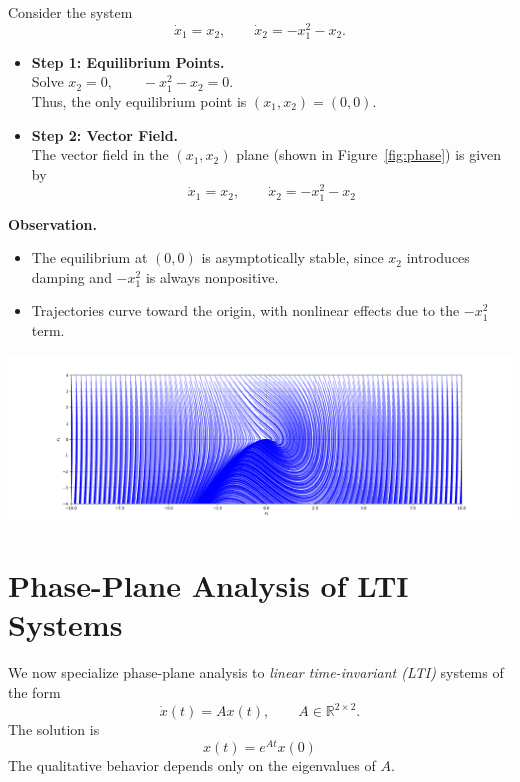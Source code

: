 \begin{example}
Consider the system
\begin{equation}
    \dot{x}_1 = x_2, \qquad 
    \dot{x}_2 = -x_1^2 - x_2.
\end{equation}

\begin{itemize}
\item \textbf{Step 1: Equilibrium Points.}  
\\Solve
$
x_2 = 0, \qquad -x_1^2 - x_2 = 0.
$
\\Thus, the only equilibrium point is
$
\boxed{(x_1, x_2) = (0,0)}.
$
\medskip
\item \textbf{Step 2: Vector Field.}  
\\The vector field in the $(x_1,x_2)$ plane (shown in Figure~\ref{fig:phase}) is given by
\begin{equation}
\boxed{\dot{x}_1 = x_2, \qquad 
\dot{x}_2 = -x_1^2 - x_2}
\end{equation}
\end{itemize}

\textbf{Observation.}  
\begin{itemize}
    \item The equilibrium at $(0,0)$ is asymptotically stable, since $x_2$ introduces damping and $-x_1^2$ is always nonpositive.  
    \item Trajectories curve toward the origin, with nonlinear effects due to the $-x_1^2$ term.
\end{itemize}
\centering
\includegraphics[width=\linewidth]{Images/nonlinear/introduction/phase.png}
\label{fig:phase}
\end{example}


\section{Phase-Plane Analysis of LTI Systems}

We now specialize phase-plane analysis to \emph{linear time-invariant (LTI)} systems of the form
\begin{equation}
    \dot{x}(t) = A x(t), \qquad A \in \mathbb{R}^{2\times 2}.
\end{equation}
The solution is
\begin{equation}
    \boxed{x(t) = e^{At} x(0)}
\end{equation}
The qualitative behavior depends only on the eigenvalues of $A$.  

